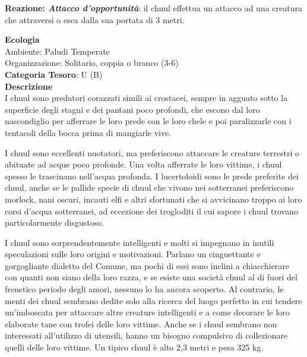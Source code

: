 \begin{multicols}{2}
{\textbf{Reazione: \emph{Attacco d'opportunità}}: il chuul effettua un attacco ad una creatura che attraversi o esca dalla sua portata di 3 metri.

\textbf{Ecologia}\\
Ambiente: Paludi Temperate\\
Organizzazione: Solitario, coppia o branco (3-6)\\
\textbf{Categoria Tesoro}: U (B)\\
\textbf{Descrizione}\\
I chuul sono predatori corazzati simili ai crostacei, sempre in agguato sotto la superficie degli stagni e dei pantani poco profondi, che escono dal loro nascondiglio per afferrare le loro prede con le loro chele e poi paralizzarle con i tentacoli della bocca prima di mangiarle vive.

I chuul sono eccellenti nuotatori, ma preferiscono attaccare le creature terrestri o abituate ad acque poco profonde. Una volta afferrate le loro vittime, i chuul spesso le trascinano nell'acqua profonda. I lucertoloidi sono le prede preferite dei chuul, anche se le pallide specie di chuul che vivono nei sotterranei preferiscono morlock, nani oscuri, incauti elfi e altri sfortunati che si avvicinano troppo ai loro corsi d'acqua sotterranei, ad eccezione dei trogloditi il cui sapore i chuul trovano particolarmente disgustoso.

I chuul sono sorprendentemente intelligenti e molti si impegnano in inutili speculazioni sulle loro origini e motivazioni. Parlano un cinguettante e gorgogliante dialetto del Comune, ma pochi di essi sono inclini a chiacchierare con quanti non siano della loro razza, e se esiste una società chuul al di fuori del frenetico periodo degli amori, nessuno lo ha ancora scoperto. Al contrario, le menti dei chuul sembrano dedite solo alla ricerca del luogo perfetto in cui tendere un'imboscata per attaccare altre creature intelligenti e a come decorare le loro elaborate tane con trofei delle loro vittime. Anche se i chuul sembrano non interessati all'utilizzo di utensili, hanno un bisogno compulsivo di collezionare quelli delle loro vittime. Un tipico chuul è alto 2,3 metri e pesa 325 kg.

}
\end{multicols}
